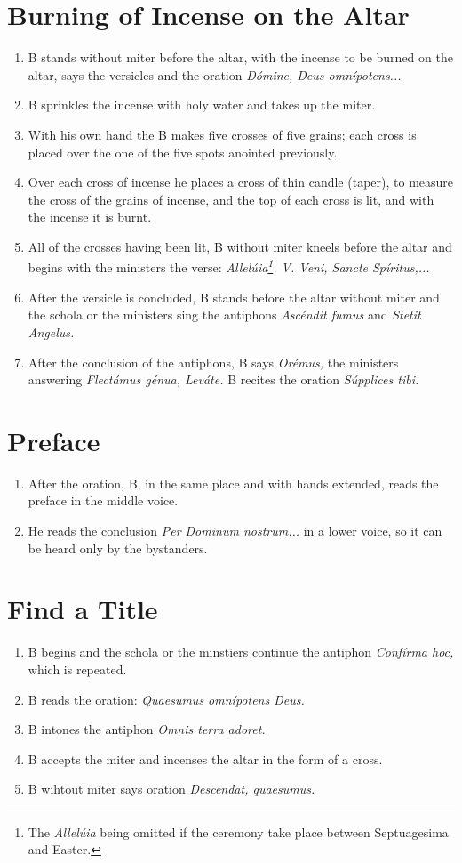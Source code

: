 \documentclass[twocolumn]{report}
\begin{document}
\section*{Burning of Incense on the Altar}
\begin{enumerate}
	\item B stands without miter before the altar, with the incense to be burned on the altar, says the versicles and the oration \textit{Dómine, Deus omnípotens...}
	\item B sprinkles the incense with holy water and takes up the miter.
	\item With his own hand the B makes five crosses of five grains; each cross is placed over the one of the five spots anointed previously.
	\item Over each cross of incense he places a cross of thin candle (taper), to measure the cross of the grains of incense, and the top of each cross is lit, and with the incense it is burnt.
	\item All of the crosses having been lit, B without miter kneels before the altar and begins with the ministers the verse: \textit{Allelúia\footnote{The \textit{Allelúia} being omitted if the ceremony take place between Septuagesima and Easter.}. V. Veni, Sancte Spíritus,...}
	\item After the versicle is concluded, B stands before the altar without miter and the schola or the ministers sing the antiphons \textit{Ascéndit fumus} and \textit{Stetit Angelus.}
	\item After the conclusion of the antiphons, B says \textit{Orémus,} the ministers answering \textit{Flectámus génua, Leváte.} B recites the oration \textit{Súpplices tibi.}
\end{enumerate}
\section*{Preface}
\begin{enumerate}
	\item After the oration, B, in the same place and with hands extended, reads the preface in the middle voice.
	\item He reads the conclusion \textit{Per Dominum nostrum...} in a lower voice, so it can be heard only by the bystanders.
\end{enumerate}
\section*{Find a Title}
\begin{enumerate}
	\item B begins and the schola or the minstiers continue the antiphon \textit{Confírma hoc,} which is repeated.
	\item B reads the oration: \textit{Quaesumus omnípotens Deus.}
	\item B intones the antiphon \textit{Omnis terra adoret.}
	\item B accepts the miter and incenses the altar in the form of a cross.
	\item B wihtout miter says oration \textit{Descendat, quaesumus.}
\end{enumerate}
\end{document}
